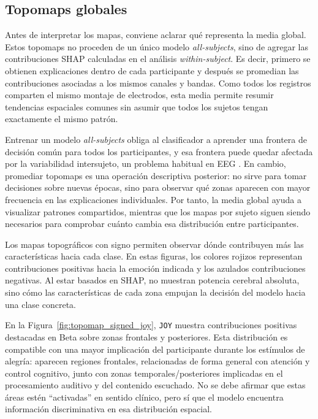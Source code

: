 \subsection{Topomaps globales}

Antes de interpretar los mapas, conviene aclarar qué representa la media global. Estos topomaps no proceden de un único modelo \textit{all-subjects}, sino de agregar las contribuciones \ac{SHAP} calculadas en el análisis \textit{within-subject}. Es decir, primero se obtienen explicaciones dentro de cada participante y después se promedian las contribuciones asociadas a los mismos canales y bandas. Como todos los registros comparten el mismo montaje de electrodos, esta media permite resumir tendencias espaciales comunes sin asumir que todos los sujetos tengan exactamente el mismo patrón.

Entrenar un modelo \textit{all-subjects} obliga al clasificador a aprender una frontera de decisión común para todos los participantes, y esa frontera puede quedar afectada por la variabilidad intersujeto, un problema habitual en \ac{EEG} \cite{rajpoot2022subject}. En cambio, promediar topomaps es una operación descriptiva posterior: no sirve para tomar decisiones sobre nuevas épocas, sino para observar qué zonas aparecen con mayor frecuencia en las explicaciones individuales. Por tanto, la media global ayuda a visualizar patrones compartidos, mientras que los mapas por sujeto siguen siendo necesarios para comprobar cuánto cambia esa distribución entre participantes.

Los mapas topográficos con signo permiten observar dónde contribuyen más las características hacia cada clase. En estas figuras, los colores rojizos representan contribuciones positivas hacia la emoción indicada y los azulados contribuciones negativas. Al estar basados en \ac{SHAP}, no muestran potencia cerebral absoluta, sino cómo las características de cada zona empujan la decisión del modelo hacia una clase concreta.

En la Figura~\ref{fig:topomap_signed_joy}, \texttt{JOY} muestra contribuciones positivas destacadas en Beta sobre zonas frontales y posteriores. Esta distribución es compatible con una mayor implicación del participante durante los estímulos de alegría: aparecen regiones frontales, relacionadas de forma general con atención y control cognitivo, junto con zonas temporales/posteriores implicadas en el procesamiento auditivo y del contenido escuchado. No se debe afirmar que estas áreas estén ``activadas'' en sentido clínico, pero sí que el modelo encuentra información discriminativa en esa distribución espacial.

